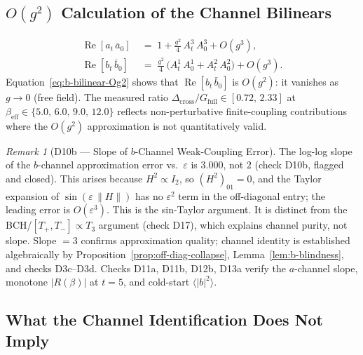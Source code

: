 \documentclass[12pt]{article}
\numberwithin{equation}{section}
\theoremstyle{plain}
\theoremstyle{definition}
\theoremstyle{remark}
\newtheorem{remark}{Remark}[section]
\newcommand{\Gfull}{G_{\mathrm{full}}}     %
\newcommand{\Dcross}{\Delta_{\mathrm{cross}}}  %
\begin{document}
	\subsection{\texorpdfstring{$O(g^{2})$}{O(g\^{}2)} Calculation
		of the Channel Bilinears}
	\label{sec:Og2-bilinears}
	
	\begin{align}
		\operatorname{Re}[a_t\,\bar{a}_0]
		&\;=\; 1 + \frac{g^{2}}{4}\,A^{3}_t\,A^{3}_0 + O(g^{3}),
		\label{eq:a-bilinear-Og2}\\[2pt]
		\operatorname{Re}[b_t\,\bar{b}_0]
		&\;=\; \frac{g^{2}}{4}\,
		\bigl(A^{1}_t\,A^{1}_0 + A^{2}_t\,A^{2}_0\bigr) + O(g^{3}).
		\label{eq:b-bilinear-Og2}
	\end{align}
	Equation~\eqref{eq:b-bilinear-Og2} shows that
	$\operatorname{Re}[b_t\,\bar{b}_0]$ is $O(g^{2})$: it vanishes as
	$g\to 0$ (free field).  The measured ratio
	$\Dcross/\Gfull \in [0.72,\,2.33]$ at
	$\beta_{\mathrm{eff}}\in\{5.0,\,6.0,\,9.0,\,12.0\}$
	\cite{FirestoneP4} reflects non-perturbative finite-coupling
	contributions where the $O(g^{2})$ approximation is not quantitatively
	valid.
	
	\begin{remark}[D10b --- Slope of $b$-Channel Weak-Coupling Error]
		\label{rem:D10b-slope}
		The log-log slope of the $b$-channel approximation error vs.\
		$\varepsilon$ is $3.000$, not $2$ (check D10b, flagged and closed).
		This arises because $H^{2}\propto I_{2}$, so $(H^{2})_{01} = 0$,
		and the Taylor expansion of $\sin(\varepsilon\,\|H\|)$ has no
		$\varepsilon^{2}$ term in the off-diagonal entry; the leading
		error is $O(\varepsilon^{3})$.  This is the sin-Taylor argument.
		It is distinct from the BCH/$[T_{+},T_{-}]\propto T_{3}$ argument
		(check D17), which explains channel purity, not slope.
		Slope $=3$ confirms approximation quality; channel identity is
		established algebraically by
		Proposition~\ref{prop:off-diag-collapse},
		Lemma~\ref{lem:b-blindness}, and checks D3c--D3d.
		Checks D11a, D11b, D12b, D13a verify the $a$-channel slope,
		monotone $|R(\beta)|$ at $t=5$, and cold-start
		$\langle|b|^{2}\rangle$.
	\end{remark}
	
	\subsection{What the Channel Identification Does Not Imply}
	\label{sec:not-imply}
	
\end{document}
